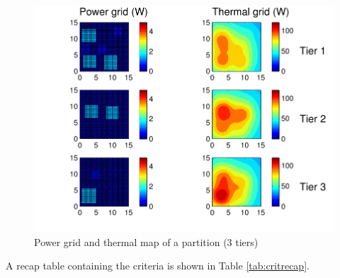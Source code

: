 \begin{enumerate}
\begin{figure}[h!]
\begin{center}
\includegraphics[width=1\linewidth]{heatmapex_gray2.pdf}
\end{center}
\vspace{-0.5cm}
\caption{Power grid and thermal map of a partition (3 tiers)}
\label{fig:thermalmap}
\end{figure}

\end{enumerate}

A recap table containing the criteria is shown in Table \ref{tab:critrecap}.

